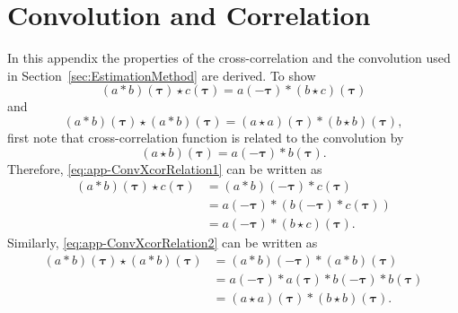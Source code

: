 \documentclass[10pt,twocolumn,twoside]{IEEEtran}
\begin{document}
{ \section{Convolution and Correlation}\label{ap:CorrelationAnalysis}
In this appendix the properties of the cross-correlation and the convolution used in Section~\ref{sec:EstimationMethod}   are derived. To show 
\begin{equation}\label{eq:app-ConvXcorRelation1}
 \left(a \ast b \right)\left(\boldsymbol\tau\right)  \star c\left(\boldsymbol\tau\right)  = a\left(-\boldsymbol\tau\right)\ast\left(b \star c\right)\left(\boldsymbol\tau\right)
\end{equation}
and
\begin{equation}\label{eq:app-ConvXcorRelation2}
(a \ast b)(\boldsymbol \tau) \star (a \ast b)(\boldsymbol\tau)=(a \star a)(\boldsymbol\tau)\ast(b \star b)(\boldsymbol\tau),
\end{equation}
first note that cross-correlation function is related to the convolution by \cite{Yarlagadda2009}
\begin{equation}\label{eq:app-ConvXcorRelation}
 \left(a \star b\right)\left(\boldsymbol\tau\right)= a\left(-\boldsymbol\tau\right)\ast b\left(\boldsymbol\tau\right).
\end{equation}
Therefore, \eqref{eq:app-ConvXcorRelation1} can be written as
\begin{align}
 \left(a \ast b\right)\left(\boldsymbol\tau\right) \star c\left(\boldsymbol\tau\right)&= \left(a \ast b\right)\left(-\boldsymbol\tau \right)\ast c\left(\boldsymbol\tau\right) \nonumber \\
&=a\left(-\boldsymbol\tau\right)\ast \left(b\left(-\boldsymbol\tau\right) \ast c\left(\boldsymbol\tau\right)\right)\nonumber \\
&=a\left(-\boldsymbol\tau\right)\ast\left(b\star c\right)\left(\boldsymbol\tau\right).
\end{align}
Similarly, \eqref{eq:app-ConvXcorRelation2} can be written as
\begin{align}
 (a \ast b)(\boldsymbol \tau) \star (a \ast b)(\boldsymbol\tau)&=(a \ast b)(-\boldsymbol\tau) \ast (a \ast b)(\boldsymbol\tau) \nonumber \\
&=a(-\boldsymbol\tau)\ast a(\boldsymbol\tau) \ast b(-\boldsymbol\tau)\ast b(\boldsymbol\tau) \nonumber \\
&=(a \star a)(\boldsymbol\tau)\ast(b \star b)(\boldsymbol\tau).
\end{align}     
}
\end{document}
